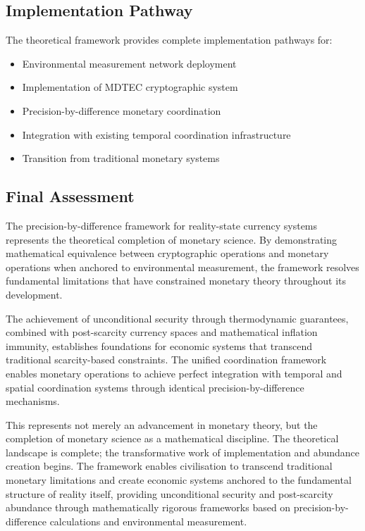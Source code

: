 \documentclass[12pt,a4paper]{article}
\begin{document}
\subsection{Implementation Pathway}

The theoretical framework provides complete implementation pathways for:
\begin{itemize}
\item Environmental measurement network deployment
\item Implementation of MDTEC cryptographic system
\item Precision-by-difference monetary coordination
\item Integration with existing temporal coordination infrastructure
\item Transition from traditional monetary systems
\end{itemize}

\subsection{Final Assessment}

The precision-by-difference framework for reality-state currency systems represents the theoretical completion of monetary science. By demonstrating mathematical equivalence between cryptographic operations and monetary operations when anchored to environmental measurement, the framework resolves fundamental limitations that have constrained monetary theory throughout its development.

The achievement of unconditional security through thermodynamic guarantees, combined with post-scarcity currency spaces and mathematical inflation immunity, establishes foundations for economic systems that transcend traditional scarcity-based constraints. The unified coordination framework enables monetary operations to achieve perfect integration with temporal and spatial coordination systems through identical precision-by-difference mechanisms.

This represents not merely an advancement in monetary theory, but the completion of monetary science as a mathematical discipline. The theoretical landscape is complete; the transformative work of implementation and abundance creation begins. The framework enables civilisation to transcend traditional monetary limitations and create economic systems anchored to the fundamental structure of reality itself, providing unconditional security and post-scarcity abundance through mathematically rigorous frameworks based on precision-by-difference calculations and environmental measurement.
\end{document}
